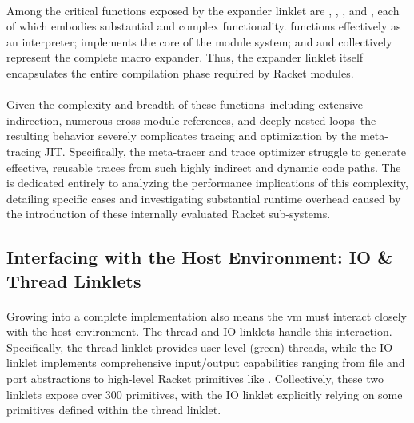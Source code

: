 			\paragraph{}%
				Among the critical functions exposed by the expander linklet are , , , and , each of which embodies substantial and complex functionality.  functions effectively as an interpreter;  implements the core of the module system; and  and  collectively represent the complete macro expander. Thus, the expander linklet itself encapsulates the entire compilation phase required by Racket modules.

			\paragraph{}%
				Given the complexity and breadth of these functions--including extensive indirection, numerous cross-module references, and deeply nested loops--the resulting behavior severely complicates tracing and optimization by the meta-tracing JIT. Specifically, the meta-tracer and trace optimizer struggle to generate effective, reusable traces from such highly indirect and dynamic code paths. The  is dedicated entirely to analyzing the performance implications of this complexity, detailing specific cases and investigating substantial runtime overhead caused by the introduction of these internally evaluated Racket sub-systems.

		\subsection{Interfacing with the Host Environment: IO \& Thread Linklets}

			\paragraph{}%
				Growing into a complete implementation also means the \gls{vm} must interact closely with the host environment. The thread and IO linklets handle this interaction. Specifically, the thread linklet provides user-level (green) threads, while the IO linklet implements comprehensive input/output capabilities ranging from file and port abstractions to high-level Racket primitives like . Collectively, these two linklets expose over 300 primitives, with the IO linklet explicitly relying on some primitives defined within the thread linklet.

